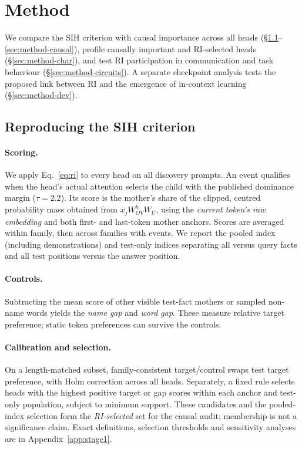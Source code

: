 \section{Method}
\label{sec:method}

We compare the SIH criterion with causal importance across all heads
(\S\ref{sec:method-ri}--\ref{sec:method-causal}), profile causally important and
RI-selected heads
(\S\ref{sec:method-char}), and test RI participation in communication and task
behaviour (\S\ref{sec:method-circuits}). A separate checkpoint analysis tests the
proposed link between RI and the emergence of in-context learning
(\S\ref{sec:method-dev}).

\subsection{Reproducing the SIH criterion}
\label{sec:method-ri}

\paragraph{Scoring.}
We apply Eq.~\ref{eq:ri} to every head on all discovery prompts. An event
qualifies when the head's actual attention selects the child with the published
dominance margin ($\tau=2.2$). Its score is the mother's share of the clipped,
centred probability mass obtained from $x_jW^h_{OV}W_U$, using the
\emph{current token's raw embedding} and both first- and last-token mother
anchors. Scores are averaged within family, then across families with events.
We report the pooled index (including demonstrations) and test-only indices
separating all versus query facts and all test positions versus the answer position.

\paragraph{Controls.}
Subtracting the mean score of other visible test-fact mothers or sampled non-name
words yields the \emph{name gap} and \emph{word gap}. These measure relative
target preference; static token preferences can survive the controls.

\paragraph{Calibration and selection.}
On a length-matched subset, family-consistent target/control swaps test target
preference, with Holm correction across all heads. Separately, a fixed rule selects
heads with the highest positive target or gap scores within each anchor and
test-only population, subject to minimum support. These candidates and the pooled-index selection form
the \emph{RI-selected} set for the causal audit; membership is not a significance
claim. Exact definitions, selection thresholds and sensitivity analyses are in
Appendix~\ref{app:stage1}.

